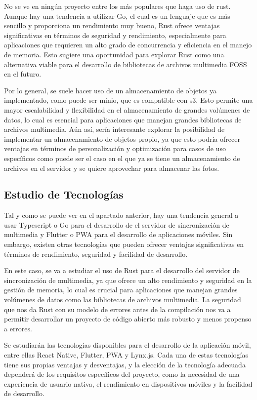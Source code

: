 No se ve en ningún proyecto entre los más populares que haga uso de \gls{rust}. Aunque hay una tendencia a utilizar Go, el cual es un lenguaje que es más sencillo y proporciona un rendimiento muy bueno, Rust ofrece ventajas significativas en términos de seguridad y rendimiento, especialmente para aplicaciones que requieren un alto grado de concurrencia y eficiencia en el manejo de memoria. Esto sugiere una oportunidad para explorar Rust como una alternativa viable para el desarrollo de bibliotecas de archivos multimedia FOSS en el futuro.

Por lo general, se suele hacer uso de un almacenamiento de objetos ya implementado, como puede ser \gls{minio}, que es compatible con \gls{s3}. Esto permite una mayor escalabilidad y flexibilidad en el almacenamiento de grandes volúmenes de datos, lo cual es esencial para aplicaciones que manejan grandes bibliotecas de archivos multimedia.
Aún así, sería interesante explorar la posibilidad de implementar un almacenamiento de objetos propio, ya que esto podría ofrecer ventajas en términos de personalización y optimización para casos de uso específicos como puede ser el caso en el que ya se tiene un almacenamiento de archivos en el servidor y se quiere aprovechar para almacenar las fotos.

\subsection{Estudio de Tecnologías}

Tal y como se puede ver en el apartado anterior, hay una tendencia general a usar Typescript o Go para el desarrollo de el servidor de sincronización de multimedia y Flutter o PWA para el desarrollo de aplicaciones móviles. Sin embargo, existen otras tecnologías que pueden ofrecer ventajas significativas en términos de rendimiento, seguridad y facilidad de desarrollo.

En este caso, se va a estudiar el uso de Rust para el desarrollo del servidor de sincronización de multimedia, ya que ofrece un alto rendimiento y seguridad en la gestión de memoria, lo cual es crucial para aplicaciones que manejan grandes volúmenes de datos como las bibliotecas de archivos multimedia.
La seguridad que nos da Rust con su modelo de errores antes de la compilación nos va a permitir desarrollar un proyecto de código abierto más robusto y menos propenso a errores.

Se estudiarán las tecnologías disponibles para el desarrollo de la aplicación móvil, entre ellas React Native, Flutter, PWA y Lynx.js. Cada una de estas tecnologías tiene sus propias ventajas y desventajas, y la elección de la tecnología adecuada dependerá de los requisitos específicos del proyecto, como la necesidad de una experiencia de usuario nativa, el rendimiento en dispositivos móviles y la facilidad de desarrollo.

